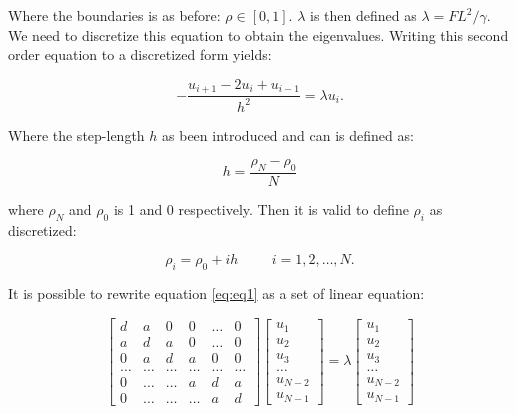 \documentclass[twoside,onecolumn]{article}
\begin{document}
\bigskip

Where the boundaries is as before: $\rho \in [0,1]$. $\lambda$ is then defined as  $\lambda= FL^2/\gamma$. We need to discretize this equation to obtain the eigenvalues. Writing this second order equation to a discretized form yields: 

\bigskip

\begin{equation}
-\frac{u_{i+1} -2u_i +u_{i-1} }{h^2}  = \lambda u_i.
\label{eq:eq1}
\end{equation}

\bigskip

Where the step-length $h$ as been introduced and can is defined as: 

\bigskip

 \begin{equation*}
  h=\frac{\rho_N-\rho_0 }{N}
\end{equation*}

\bigskip

where $\rho_N$ and $\rho_0$ is 1 and 0 respectively. Then it is valid to define $\rho_i$ as discretized:

\bigskip

 \begin{equation*}
    \rho_i= \rho_0 + ih \hspace{1cm} i=1,2,\dots , N.
\end{equation*}

\bigskip

It is possible to rewrite equation \ref{eq:eq1} as a set of linear equation: 

\bigskip

\begin{equation*}
    \begin{bmatrix} d& a & 0   & 0    & \dots  & 0 \\
                                a & d & a & 0    & \dots &0 \\
                                0   & a & d & a  &0      & 0\\
                                \dots  & \dots & \dots & \dots  &\dots      &\dots\\
                                0   & \dots & \dots &a  &d & a\\
                                0   & \dots & \dots & \dots  &a & d\end{bmatrix} 
                                 \begin{bmatrix} u_1 \\ u_2 \\ u_3 \\ \dots \\ u_{N-2} \\ u_{N-1}\end{bmatrix} = \lambda \begin{bmatrix} u_1 \\ u_2 \\ u_3 \\ \dots \\ u_{N-2} \\ u_{N-1}\end{bmatrix}
\end{equation*}
\end{document}
